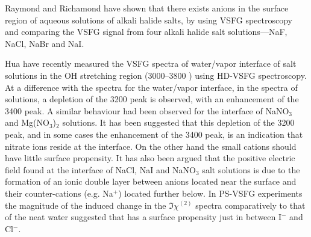 Raymond and Richamond have shown that there exists anions in the surface region of aqueous solutions of alkali halide salts, 
by using VSFG spectroscopy and comparing the VSFG signal from four alkali halide salt solutions---NaF, NaCl, NaBr 
and NaI. 

%
Hua \etal\cite{HuaWei2014} have recently measured the VSFG spectra of water/vapor interface of \LiN salt solutions in the OH stretching region
(3000--3800 \centimeter) using HD-VSFG spectroscopy\cite{HuaWei2011,HuaWei2011b,ChenXiangKe2010}. 
At a difference with the spectra for the water/vapor interface, in the spectra of 
\LiN solutions, a depletion of the 3200 \cm peak is observed, with an 
enhancement of the 3400 \cm peak.
A similar behaviour had been observed for the interface of NaNO$_3$ and 
Mg(NO$_3$)$_2$ solutions\cite{AJ12,HuaWei2014}. It has been 
suggested that this depletion of the 3200 \cm peak, and in some cases 
the enhancement of the 3400 \cm peak, is an indication that nitrate 
ions reside at the interface. On the other hand the small 
cations should have little surface propensity. 
It has also been argued that the positive electric field found at the interface of NaCl, NaI and 
NaNO$_3$ salt solutions is due to the formation of an ionic double layer 
between anions located near the surface and their counter-cations (e.g.
Na$^+$) located further below. In PS-VSFG experiments the 
magnitude of the induced change in the $\Im\chi^{(2)}$ spectra comparatively
to that of the neat water suggested that \nitrate has a surface propensity 
just in between I$^-$ and Cl$^-$\cite{Verreault2013,Verreault2009}. 




